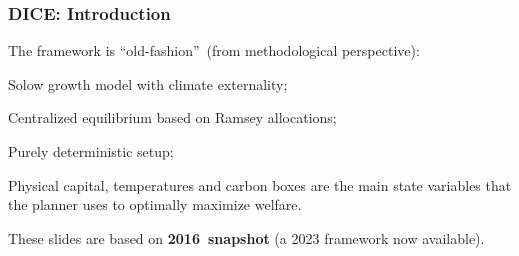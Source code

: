 \documentclass[xcolor=x11names,compress,aspectratio=169]{beamer}%
\makeatletter
\newenvironment{stepitemizewithalert}{\begin{itemize}[<+-| alert@+>]}{\end{itemize} }
\renewenvironment{itemize}{\begin{compactitemize}[<+-| alert@+>]}{\end{compactitemize}}
\renewenvironment{stepitemizewithalert}{\begin{compactitemize}[<+-| alert@+>]}{\end{compactitemize}}
\renewenvironment{stepitemizewithalert}{\begin{itemize}}{\end{itemize}}
\makeatother
\begin{document}
\begin{frame}%
%

\frametitle{DICE: Introduction}%


\begin{stepitemizewithalert}
\item The framework is \textquotedblleft old-fashion\textquotedblright\ (from
methodological perspective):%
\vspace{3ex}%


\begin{itemize}
\item Solow growth model with climate externality;%
\vspace{1ex}%


\item Centralized equilibrium based on Ramsey allocations;%
\vspace{1ex}%


\item Purely deterministic setup;%
\vspace{3ex}%

\end{itemize}

\item Physical capital, temperatures and carbon boxes are the main state
variables that the planner uses to optimally maximize welfare.%
\vspace{3ex}%


\item These slides are based on \textbf{2016\ snapshot} (a 2023 framework now available).
\end{stepitemizewithalert}

%

\transboxout
\end{frame}%
%
\end{document}
